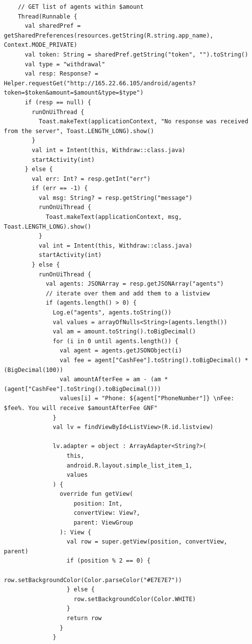 \documentclass[11pt, a4paper]{article}
\begin{document}
\begin{appendices}
\begin{lstlisting}
    // GET list of agents within $amount
    Thread(Runnable {
      val sharedPref = getSharedPreferences(resources.getString(R.string.app_name), Context.MODE_PRIVATE)
      val token: String = sharedPref.getString("token", "").toString()
      val type = "withdrawal"
      val resp: Response? = Helper.requestGet("http://165.22.66.105/android/agents?token=$token&amount=$amount&type=$type")
      if (resp == null) {
        runOnUiThread {
          Toast.makeText(applicationContext, "No response was received from the server", Toast.LENGTH_LONG).show()
        }
        val int = Intent(this, Withdraw::class.java)
        startActivity(int)
      } else {
        val err: Int? = resp.getInt("err")
        if (err == -1) {
          val msg: String? = resp.getString("message")
          runOnUiThread {
            Toast.makeText(applicationContext, msg, Toast.LENGTH_LONG).show()
          }
          val int = Intent(this, Withdraw::class.java)
          startActivity(int)
        } else {
          runOnUiThread {
            val agents: JSONArray = resp.getJSONArray("agents")
            // iterate over them and add them to a listview
            if (agents.length() > 0) {
              Log.e("agents", agents.toString())
              val values = arrayOfNulls<String>(agents.length())
              val am = amount.toString().toBigDecimal()
              for (i in 0 until agents.length()) {
                val agent = agents.getJSONObject(i)
                val fee = agent["CashFee"].toString().toBigDecimal() * (BigDecimal(100))
                val amountAfterFee = am - (am * (agent["CashFee"].toString().toBigDecimal()))
                values[i] = "Phone: ${agent["PhoneNumber"]} \nFee: $fee%. You will receive $amountAfterFee GNF"
              }
              val lv = findViewById<ListView>(R.id.listview)

              lv.adapter = object : ArrayAdapter<String?>(
                  this,
                  android.R.layout.simple_list_item_1,
                  values
              ) {
                override fun getView(
                    position: Int,
                    convertView: View?,
                    parent: ViewGroup
                ): View {
                  val row = super.getView(position, convertView, parent)
                  if (position % 2 == 0) {
                    row.setBackgroundColor(Color.parseColor("#E7E7E7"))
                  } else {
                    row.setBackgroundColor(Color.WHITE)
                  }
                  return row
                }
              }


\end{lstlisting}
\end{appendices}
\end{document}
